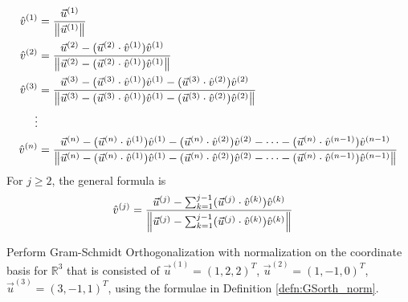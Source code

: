 \begin{defn}
\label{defn:GSorth_norm}
\begin{align}
\hat{v}^{(1)} &= \frac{\vec{u}^{(1)}}{\norm{\vec{u}^{(1)}}} \nonumber \\
\hat{v}^{(2)} &= \frac{\vec{u}^{(2)} - (\vec{u}^{(2)} \cdot \hat{v}^{(1)})\hat{v}^{(1)}}{\norm{\vec{u}^{(2)} - (\vec{u}^{(2)} \cdot \hat{v}^{(1)})\hat{v}^{(1)}}} \nonumber \\
\hat{v}^{(3)} &= \frac{\vec{u}^{(3)} - (\vec{u}^{(3)} \cdot \hat{v}^{(1)})\hat{v}^{(1)} - (\vec{u}^{(3)} \cdot \hat{v}^{(2)})\hat{v}^{(2)}}{\norm{\vec{u}^{(3)} - (\vec{u}^{(3)} \cdot \hat{v}^{(1)})\hat{v}^{(1)} - (\vec{u}^{(3)} \cdot \hat{v}^{(2)})\hat{v}^{(2)}}} \\
\vdots \nonumber \\
\hat{v}^{(n)} &= \frac{\vec{u}^{(n)} - (\vec{u}^{(n)} \cdot \hat{v}^{(1)})\hat{v}^{(1)} - (\vec{u}^{(n)} \cdot \hat{v}^{(2)})\hat{v}^{(2)} - \cdots - (\vec{u}^{(n)} \cdot \hat{v}^{(n-1)})\hat{v}^{(n-1)}}{\norm{\vec{u}^{(n)} - (\vec{u}^{(n)} \cdot \hat{v}^{(1)})\hat{v}^{(1)} - (\vec{u}^{(n)} \cdot \hat{v}^{(2)})\hat{v}^{(2)} - \cdots - (\vec{u}^{(n)} \cdot \hat{v}^{(n-1)})\hat{v}^{(n-1)}}} \nonumber
\end{align}
For $j \geq 2$, the general formula is
\begin{align}
\hat{v}^{(j)} &= \frac{\vec{u}^{(j)} - \sum_{k=1}^{j-1}(\vec{u}^{(j)} \cdot \hat{v}^{(k)})\hat{v}^{(k)}}{\norm{\vec{u}^{(j)} - \sum_{k=1}^{j-1}(\vec{u}^{(j)} \cdot \hat{v}^{(k)})\hat{v}^{(k)}}} \label{eqn:GSorth_norm}
\end{align}
\end{defn}
\begin{exmp}
\label{exmp:GS_ex}
Perform Gram-Schmidt Orthogonalization with normalization on the coordinate basis for $\mathbb{R}^3$ that is consisted of $\vec{u}^{(1)} = (1,2,2)^T$, $\vec{u}^{(2)} = (1,-1,0)^T$, $\vec{u}^{(3)} = (3,-1,1)^T$, using the formulae in Definition \ref{defn:GSorth_norm}.
\end{exmp}
